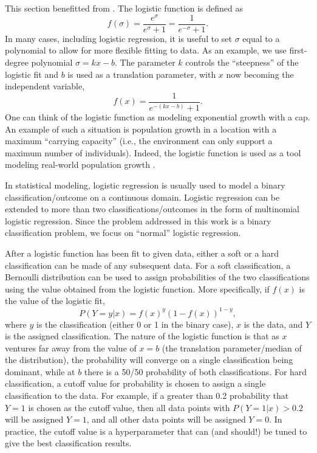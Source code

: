 This section benefitted from \cite{lrwiki}.  The logistic function is defined as
\begin{equation}
f(\sigma) = \frac{e^\sigma}{e^\sigma+1} = \frac{1}{e^{-\sigma}+1}.
\end{equation}
In many cases, including logistic regression, it is useful to set $\sigma$ equal to a polynomial to allow for more flexible fitting to data.  As an example, we use first-degree polynomial $\sigma = kx - b$.  The parameter $k$ controls the ``steepness'' of the logistic fit and $b$ is used as a translation parameter, with $x$ now becoming the independent variable,
\begin{equation}
f(x) = \frac{1}{e^{-(kx-b)} + 1}.
\end{equation}
One can think of the logistic function as modeling exponential growth with a cap.  An example of such a situation is population growth in a location with a maximum ``carrying capacity'' (i.e., the environment can only support a maximum number of individuals).  Indeed, the logistic function is used as a tool modeling real-world population growth \cite{populationgrowth}.

In statistical modeling, logistic regression is usually used to model a binary classification/outcome on a continuous domain.  Logistic regression can be extended to more than two classifications/outcomes in the form of multinomial logistic regression.  Since the problem addressed in this work is a binary classification problem, we focus on ``normal'' logistic regression.

After a logistic function has been fit to given data, either a soft or a hard classification can be made of any subsequent data.  For a soft classification, a Bernoulli distribution can be used to assign probabilities of the two classifications using the value obtained from the logistic function.  More specifically, if $f(x)$ is the value of the logistic fit,
\begin{equation}
P(Y=y | x) = f(x)^y(1-f(x))^{1-y},
\end{equation}
where $y$ is the classification (either 0 or 1 in the binary case), $x$ is the data, and $Y$ is the assigned classification.  The nature of the logistic function is that as $x$ ventures far away from the value of $x=b$ (the translation parameter/median of the distribution), the probability will converge on a single classification being dominant, while at $b$ there is a 50/50 probability of both classifications.  For hard classification, a cutoff value for probability is chosen to assign a single classification to the data.  For example, if a greater than 0.2 probability that $Y=1$ is chosen as the cutoff value, then all data points with $P(Y=1|x) > 0.2$ will be assigned $Y=1$, and all other data points will be assigned $Y=0$.  In practice, the cutoff value is a hyperparameter that can (and should!) be tuned to give the best classification results.